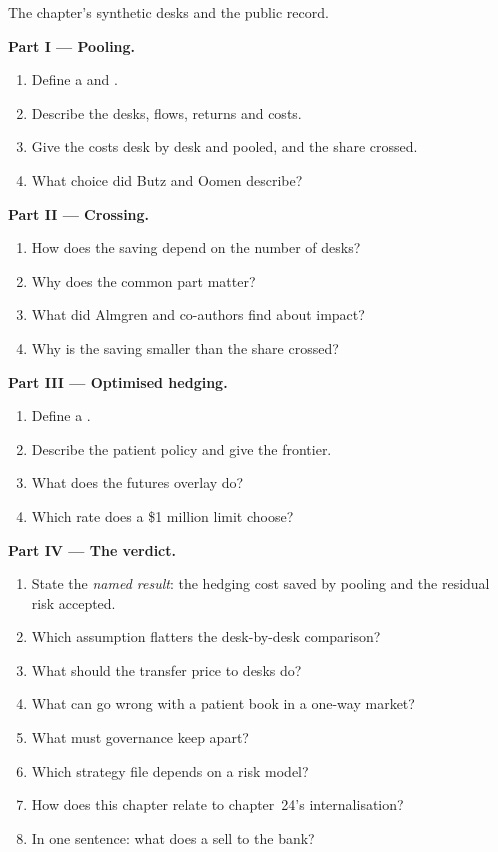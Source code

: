 \begin{problem}\label{pb:s2:the-central-risk-book:1}
The chapter's synthetic desks and the public record.

\medskip\noindent\textbf{Part I --- Pooling.}
\begin{enumerate}
\item Define a  and .
\item Describe the desks, flows, returns and costs.
\item Give the costs desk by desk and pooled, and the share crossed.
\item What choice did Butz and Oomen describe?
\end{enumerate}

\medskip\noindent\textbf{Part II --- Crossing.}
\begin{enumerate}[resume]
\item How does the saving depend on the number of desks?
\item Why does the common part matter?
\item What did Almgren and co-authors find about impact?
\item Why is the saving smaller than the share crossed?
\end{enumerate}

\medskip\noindent\textbf{Part III --- Optimised hedging.}
\begin{enumerate}[resume]
\item Define a .
\item Describe the patient policy and give the frontier.
\item What does the futures overlay do?
\item Which rate does a \$1 million limit choose?
\end{enumerate}

\medskip\noindent\textbf{Part IV --- The verdict.}
\begin{enumerate}[resume]
\item State the \emph{named result}: the hedging cost saved by pooling and the residual risk accepted.
\item Which assumption flatters the desk-by-desk comparison?
\item What should the transfer price to desks do?
\item What can go wrong with a patient book in a one-way market?
\item What must governance keep apart?
\item Which strategy file depends on a risk model?
\item How does this chapter relate to chapter~24's internalisation?
\item In one sentence: what does a  sell to the bank?
\end{enumerate}
\end{problem}

